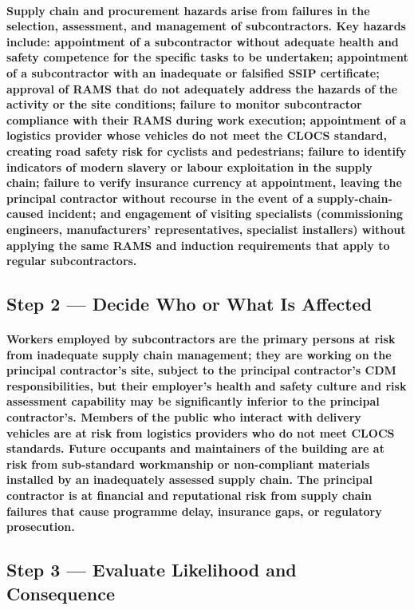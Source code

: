 \paragraph{Supply chain and procurement hazards arise from failures in the selection, assessment, and management of subcontractors. Key hazards include: appointment of a subcontractor without adequate health and safety competence for the specific tasks to be undertaken; appointment of a subcontractor with an inadequate or falsified SSIP certificate; approval of RAMS that do not adequately address the hazards of the activity or the site conditions; failure to monitor subcontractor compliance with their RAMS during work execution; appointment of a logistics provider whose vehicles do not meet the CLOCS standard, creating road safety risk for cyclists and pedestrians; failure to identify indicators of modern slavery or labour exploitation in the supply chain; failure to verify insurance currency at appointment, leaving the principal contractor without recourse in the event of a supply-chain-caused incident; and engagement of visiting specialists (commissioning engineers, manufacturers' representatives, specialist installers) without applying the same RAMS and induction requirements that apply to regular subcontractors.}

\subsection{Step 2 --- Decide Who or What Is Affected}
\paragraph{Workers employed by subcontractors are the primary persons at risk from inadequate supply chain management; they are working on the principal contractor's site, subject to the principal contractor's CDM responsibilities, but their employer's health and safety culture and risk assessment capability may be significantly inferior to the principal contractor's. Members of the public who interact with delivery vehicles are at risk from logistics providers who do not meet CLOCS standards. Future occupants and maintainers of the building are at risk from sub-standard workmanship or non-compliant materials installed by an inadequately assessed supply chain. The principal contractor is at financial and reputational risk from supply chain failures that cause programme delay, insurance gaps, or regulatory prosecution.}

\subsection{Step 3 --- Evaluate Likelihood and Consequence}
